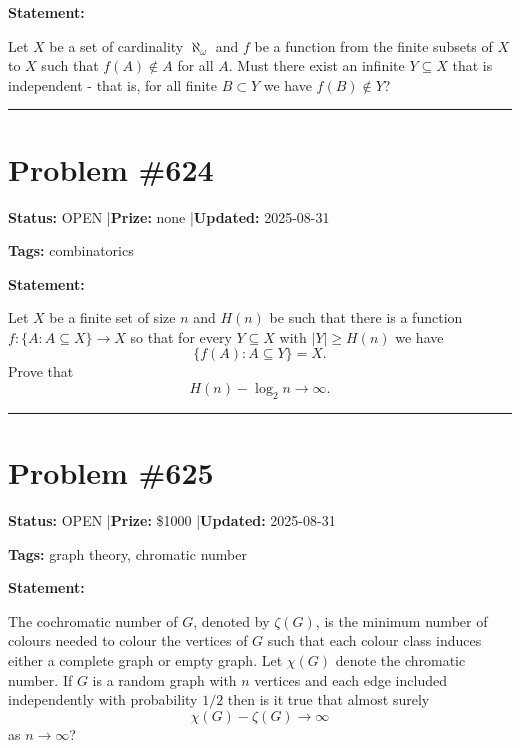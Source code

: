 \documentclass{article}
\begin{document}
\medskip

\noindent\textbf{Statement:}

Let $X$ be a set of cardinality $\aleph_\omega$ and $f$ be a function from the finite subsets of $X$ to $X$ such that $f(A)\not\in A$ for all $A$. Must there exist an infinite $Y\subseteq X$ that is independent - that is, for all finite $B\subset Y$ we have $f(B)\not\in Y$?

\noindent\rule{\linewidth}{0.4pt}


\section{Problem \#624}
\label{prob:624}

\noindent\textbf{Status:} OPEN \quad|\quad \textbf{Prize:} none \quad|\quad \textbf{Updated:} 2025-08-31

\noindent\textbf{Tags:} combinatorics

\medskip

\noindent\textbf{Statement:}

Let $X$ be a finite set of size $n$ and $H(n)$ be such that there is a function $f:\{A : A\subseteq X\}\to X$ so that for every $Y\subseteq X$ with $\lvert Y\rvert \geq H(n)$ we have\[\{ f(A) : A\subseteq Y\}=X.\]Prove that\[H(n)-\log_2 n \to \infty.\]

\noindent\rule{\linewidth}{0.4pt}


\section{Problem \#625}
\label{prob:625}

\noindent\textbf{Status:} OPEN \quad|\quad \textbf{Prize:} \$1000 \quad|\quad \textbf{Updated:} 2025-08-31

\noindent\textbf{Tags:} graph theory, chromatic number

\medskip

\noindent\textbf{Statement:}

The cochromatic number of $G$, denoted by $\zeta(G)$, is the minimum number of colours needed to colour the vertices of $G$ such that each colour class induces either a complete graph or empty graph. Let $\chi(G)$ denote the chromatic number. If $G$ is a random graph with $n$ vertices and each edge included independently with probability $1/2$ then is it true that almost surely\[\chi(G) - \zeta(G) \to \infty\]as $n\to \infty$?
\end{document}
